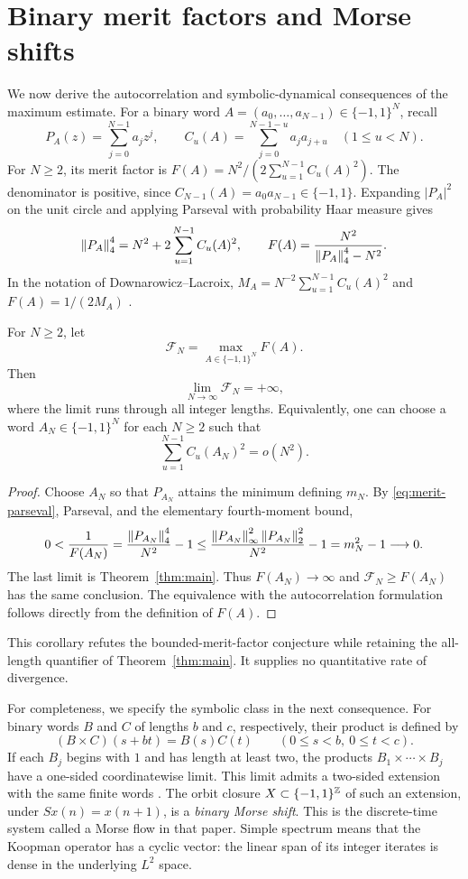 \section{Binary merit factors and Morse shifts}\label{sec:merit-morse}
We now derive the autocorrelation and symbolic-dynamical consequences of
the maximum estimate. For a binary word
$A=(a_0,\ldots,a_{N-1})\in\{-1,1\}^N$, recall
\[
 P_A(z)=\sum_{j=0}^{N-1}a_jz^j,
 \qquad C_u(A)=\sum_{j=0}^{N-1-u}a_ja_{j+u}\quad(1\le u<N).
\]
For $N\ge2$, its merit factor is
$F(A)=N^2/(2\sum_{u=1}^{N-1}C_u(A)^2)$. The denominator is positive, since
$C_{N-1}(A)=a_0a_{N-1}\in\{-1,1\}$. Expanding $|P_A|^2$ on the unit
circle and applying Parseval with probability Haar measure gives
\begin{equation}\label{eq:merit-parseval}
 \left\lVert P_A\right\rVert_4^4=N^2+2\sum_{u=1}^{N-1}C_u(A)^2,
 \qquad
 F(A)=\frac{N^2}{\left\lVert P_A\right\rVert_4^4-N^2}.
\end{equation}
In the notation of Downarowicz--Lacroix,
$M_A=N^{-2}\sum_{u=1}^{N-1}C_u(A)^2$ and $F(A)=1/(2M_A)$
\cite[Definition~2 and Lemma~0]{DownarowiczLacroix1998}.

\begin{corollary}\label{cor:merit}
For $N\ge2$, let
\[
 \mathcal F_N=\max_{A\in\{-1,1\}^N}F(A).
\]
Then
\[
 \lim_{N\to\infty}\mathcal F_N=+\infty,
\]
where the limit runs through all integer lengths. Equivalently, one can
choose a word $A_N\in\{-1,1\}^N$ for each $N\ge2$ such that
\[
 \sum_{u=1}^{N-1}C_u(A_N)^2=o(N^2).
\]
\end{corollary}
\begin{proof}
Choose $A_N$ so that $P_{A_N}$ attains the minimum defining $m_N$.
By \eqref{eq:merit-parseval}, Parseval, and the elementary fourth-moment
bound,
\[
 0<\frac1{F(A_N)}
 =\frac{\left\lVert P_{A_N}\right\rVert_4^4}{N^2}-1
 \le\frac{\left\lVert P_{A_N}\right\rVert_\infty^2\left\lVert P_{A_N}\right\rVert_2^2}{N^2}-1
 =m_N^2-1\longrightarrow0.
\]
The last limit is Theorem~\ref{thm:main}. Thus $F(A_N)\to\infty$ and
$\mathcal F_N\ge F(A_N)$ has the same conclusion. The equivalence with
the autocorrelation formulation follows directly from the definition of
$F(A)$.
\end{proof}

This corollary refutes the bounded-merit-factor conjecture while retaining
the all-length quantifier of Theorem~\ref{thm:main}. It supplies no
quantitative rate of divergence.

For completeness, we specify the symbolic class in the next consequence.
For binary words $B$ and $C$ of lengths $b$ and $c$, respectively, their
product is defined by
\[
 (B\times C)(s+bt)=B(s)C(t)\qquad(0\le s<b,\ 0\le t<c).
\]
If each $B_j$ begins with $1$ and has length at least two, the products
$B_1\times\cdots\times B_j$ have a one-sided coordinatewise limit.
This limit admits a two-sided extension with the same finite words
\cite[Definition~3 and the following paragraph]{DownarowiczLacroix1998}.
The orbit closure $X\subset\{-1,1\}^{\mathbb Z}$ of such an extension, under
$Sx(n)=x(n+1)$, is a \emph{binary Morse shift}. This is the discrete-time
system called a Morse flow in that paper. Simple spectrum means that the
Koopman operator has a cyclic vector: the linear span of its integer iterates is
dense in the underlying $L^2$ space.

